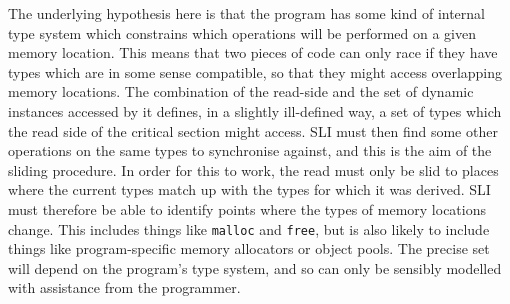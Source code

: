 The underlying hypothesis here is that the program has some kind of internal type system which constrains which operations will be performed on a given memory location.
This means that two pieces of code can only race if they have types which are in some sense compatible, so that they might access overlapping memory locations.
The combination of the read-side \StateMachine and the set of dynamic instances accessed by it defines, in a slightly ill-defined way, a set of types which the read side of the critical section might access.
SLI must then find some other operations on the same types to synchronise against, and this is the aim of the sliding procedure.
In order for this to work, the read \StateMachine must only be slid to places where the current types match up with the types for which it was derived.
SLI must therefore be able to identify points where the types of memory locations change.
This includes things like \verb|malloc| and \verb|free|, but is also likely to include things like program-specific memory allocators or object pools.
The precise set will depend on the program's type system, and so can only be sensibly modelled with assistance from the programmer.





